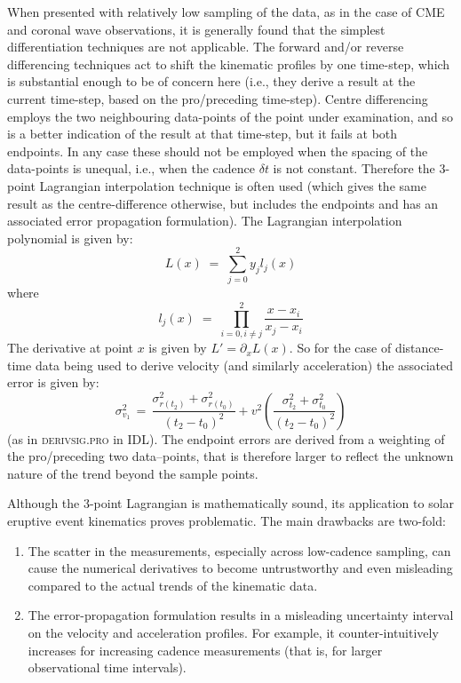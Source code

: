\documentclass[structabstract]{aa}
\begin{document}
When presented with relatively low sampling of the data, as in the case of CME and coronal wave observations, it is generally found that the simplest differentiation techniques are not applicable. The forward and/or reverse differencing techniques act to shift the kinematic profiles by one time-step, which is substantial enough to be of concern here (i.e., they derive a result at the current time-step, based on the pro/preceding time-step). Centre differencing employs the two neighbouring data-points of the point under examination, and so is a better indication of the result at that time-step, but it fails at both endpoints. In any case these should not be employed when the spacing of the data-points is unequal, i.e., when the cadence $\delta t$ is not constant. Therefore the 3-point Lagrangian interpolation technique is often used (which gives the same result as the centre-difference otherwise, but includes the endpoints and has an associated error propagation formulation). The Lagrangian interpolation polynomial is given by:
\begin{equation}
L(x) \; =\; \sum_{j=0}^2 y_j l_j(x) 
\end{equation}
where
\begin{equation}
l_j(x) \; =\; \prod_{i=0, i\neq j}^2 \frac{x-x_i}{x_j-x_i} 
\end{equation}
The derivative at point $x$ is given by $L'=\partial_x L(x)$. So for the case of distance-time data being used to derive velocity (and similarly acceleration) the associated error is given by:
\begin{equation}
\sigma_{v_1}^2 \,=\, \frac{\sigma_{r(t_2)}^2+\sigma_{r(t_0)}^2}{(t_2-t_0)^2} + v^2 \left( \frac{\sigma_{t_2}^2+\sigma_{t_0}^2}{(t_2-t_0)^2} \right)
\label{vel_err}
\end{equation}
(as in \textsc{derivsig.pro} in IDL). The endpoint errors are derived from a weighting of the pro/preceding two data--points, that is therefore larger to reflect the unknown nature of the trend beyond the sample points.

Although the 3-point Lagrangian is mathematically sound, its application to solar eruptive event kinematics proves problematic. The main drawbacks are two-fold:
\begin{enumerate}
\item The scatter in the measurements, especially across low-cadence sampling, can cause the numerical derivatives to become untrustworthy and even misleading compared to the actual trends of the kinematic data.
\item The error-propagation formulation results in a misleading uncertainty interval on the velocity and acceleration profiles. For example, it counter-intuitively increases for increasing cadence measurements (that is, for larger observational time intervals).
\end{enumerate}
\end{document}
